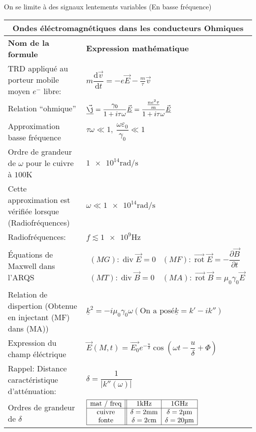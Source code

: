 \documentclass[10pt,a4paper,titlepage,portrait]{article}
\renewcommand{\d}
{
    \mathrm{d}
}
\newcommand*{\dv}[2]
{
    \dfrac{\d#1}{\d#2}
}
\newcommand*{\dpv}[2]
{
    \dfrac{\partial#1}{\partial#2}
}
\newcommand{\rot}
{
    \vec{\operatorname{rot}}
}
\renewcommand{\div}
{
    \operatorname{div}
}
\renewcommand{\arraystretch}{2}
\begin{document}
On se limite à des signaux lentements variables (En basse fréquence)

\begin{table}[H]
    \centering
    \renewcommand{\arraystretch}{1.5} %
    \setlength{\tabcolsep}{8pt} %
    \begin{tabular}{@{}p{9cm}p{10cm}@{}}
        \toprule
        \multicolumn{2}{c}{\textbf{Ondes éléctromagnétiques dans les conducteurs Ohmiques}} \\
        \midrule
        \textbf{Nom de la formule} & \textbf{Expression mathématique} \\
        \midrule
        TRD appliqué au porteur mobile moyen $e^-$ libre: & $m\dv{\vec{v}}{t} = -e\vec{E} - \frac{m}{\tau}\vec{v}$ \\
        Relation ``ohmique'' & $\vec{\underline{\j}} =\dfrac{\gamma_0}{1+i\tau\omega}\vec{\underline{E}} = \dfrac{\frac{ne^2\tau}{m}}{1+i\tau\omega}\vec{\underline{E}}$ \\
        Approximation basse fréquence & $\tau\omega \ll 1, \ \dfrac{\omega\varepsilon_0}{\gamma_0}\ll1$ \\ 
        Ordre de grandeur de $\omega$ pour le cuivre à $\num{100} \unit{\kelvin}$ & $\num{1e14} \unit{\radian\per\second}$ \\
        Cette approximation est vérifiée lorsque (Radiofréquences) & $\omega \ll \num{1e14}\unit{\radian\per\second}$ \\
        Radiofréquences: & $f \lesssim \num{1e9}\unit{\Hz}$ \\
        Équations de Maxwell dans l'ARQS & $\begin{matrix}(MG): \div \vec{E} = 0 & (MF): \rot\vec{E} = -\dpv{\vec{B}}{t} \\ (MT): \div \vec{B} = 0 & (MA): \rot \vec{B} = \mu_0\gamma_0\vec{E}\end{matrix}$ \\
        Relation de dispertion (Obtenue en injectant (MF) dans (MA))& $\underline{k}^2 = -i\mu_0\gamma_0\omega (\text{On a posé} \underline{k} = k'-ik'')$ \\
        Expression du champ éléctrique & $\vec{E}(M,t )=\vec{E_0}e^{-\frac{u}{\delta}}\cos\left(\omega t - \dfrac{u}{\delta} + \Phi\right)$ \\
        Rappel: Distance caractéristique d'atténuation: & $\delta = \dfrac{1}{|k''(\omega)|}$ \\ 
        Ordres de grandeur de $\delta$ & $\begin{array}{|c||c|c|} \hline \text{mat / freq} & \num{1}\unit{\kHz} & \num{1}\unit{\GHz} \\ \hline \text{cuivre} & \delta = \num{2}\unit{\mm} & \delta = \num{2}\unit{\micro\meter} \\ \text{fonte} & \delta =  \num{2}\unit{\cm} & \delta = \num{20}\unit{\micro\meter} \\ \hline \end{array}$ \\ 

\end{tabular}
\end{table}
\end{document}
